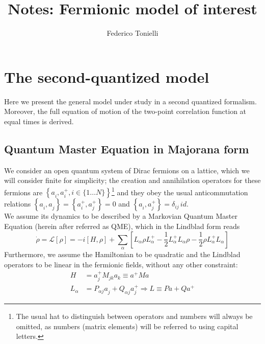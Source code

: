 \documentclass[a4paper,11pt]{article}
\title{Notes: Fermionic model of interest}
\author{Federico Tonielli}
\newcommand\blankpage{%
    \null
    \thispagestyle{empty}%
    \addtocounter{page}{-1}%
    \newpage}
\theoremstyle{remark}
\newcommand{\ro}{\rho}
\newcommand{\np}{\vskip 1.3cm}
\begin{document}
 \maketitle
 
 \tableofcontents
 \blankpage
 
 \section{The second-quantized model}
 Here we present the general model under study in a second quantized formalism.  Moreover, the full equation of motion of the two-point correlation function at equal times is derived.
  \np
  \subsection{Quantum Master Equation in Majorana form}
   We consider an open quantum system of Dirac fermions on a lattice, which we will consider finite for simplicity; the creation and annihilation operators for these fermions are $\left \{ a_i^{ },a_i^+, i\in \{1\dots N\} \right \} $\footnote{ The usual hat to distinguish between operators and numbers will always be omitted, as numbers (matrix elements) will be referred to using capital letters.} and they obey the usual anticommutation relations $\left\{a_i^{ },a_j^{ }\right\} = \left\{a_i^{+},a_j^+\right \}=0$ and $\left\{a_i^{ },a_j^+\right \} = \delta_{ij}\,id $.\\  We assume its dynamics to be described by a Markovian Quantum Master Equation (herein after referred as QME), which in the Lindblad form reads
   \[\dot{\ro}=\mathcal{L}[\ro]=-i\left[H,\ro\right]+\sum_{\alpha}\left[L_{\alpha}^{ }\ro L_{\alpha}^+ - \frac{1}{2}L_{\alpha}^+L_{\alpha}^{ }\ro - \frac{1}{2}\ro L_{\alpha}^+L_{\alpha}^{ }\right]  \]
   Furthermore, we assume the Hamiltonian to be quadratic and the Lindblad operators to be linear in the fermionic fields, without any other constraint: 
   \begin{subequations}        %
   \label{eq:quadr_dyn}         %
   \begin{align}
    H & = a_j^+M_{jk}a_k^{ } \equiv a^+Ma \label{eq:quadr_ham}\\         %
    L_{\alpha} & = P^{ }_{\alpha j}a_j^{ } + Q^{ }_{\alpha j}a_j^+ \Rightarrow L \equiv P a + Q a^+ \label{eq:quadr_lindb}
   \end{align}
   \end{subequations}
\end{document}
